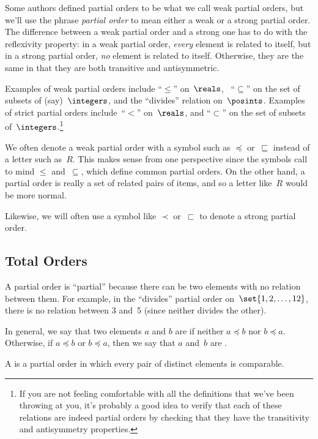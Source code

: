 Some authors defined partial orders to be what we call weak partial
orders, but we'll use the phrase \emph{partial order} to mean either a
weak or a strong partial order.  The difference between a weak partial
order and a strong one has to do with the reflexivity property: in a
weak partial order, \emph{every} element is related to itself, but in
a strong partial order, \emph{no} element is related to itself.
Otherwise, they are the same in that they are both transitive and
antisymmetric.

Examples of weak partial orders include ``$\le$'' on~$\reals$,
\ ``$\subseteq$'' on the set of subsets of (say)~$\integers$, and the
``divides'' relation on~$\posints$.  Examples of strict partial
orders include~``$<$'' on~$\reals$, and ``$\subset$'' on the set of
subsets of~$\integers$.\footnote{If you are not feeling comfortable
  with all the definitions that we've been throwing at you, it's
  probably a good idea to verify that each of these relations are
  indeed partial orders by checking that they have the transitivity
  and antisymmetry properties.}

We often denote a weak partial order with a symbol such as $\preceq$
or~$\sqsubseteq$ instead of a letter such as~$R$.    This makes sense
from one perspective since the symbols call to mind $\le$
and~$\subseteq$, which define common partial orders.  On the other
hand, a partial order is really a set of related pairs of items, and
so a letter like~$R$ would be more normal.

Likewise, we will often use a symbol like $\prec$ or~$\sqsubset$ to
denote a strong partial order.

\subsection{Total Orders}

A partial order is ``partial'' because there can be two elements with
no relation between them.  For example, in the ``divides'' partial
order on~$\set{1, 2, \dots, 12}$, there is no relation between 3 and~5
(since neither divides the other).

In general, we say that two elements $a$ and $b$ are
 if neither $a \preceq b$ nor $b \preceq a$.
Otherwise, if $a \preceq b$ or $b \preceq a$, then we say that $a$
and~$b$ are .

\begin{definition}\label{def:total_order}
A  is a partial order in which every pair of
distinct elements is comparable.
\end{definition}

